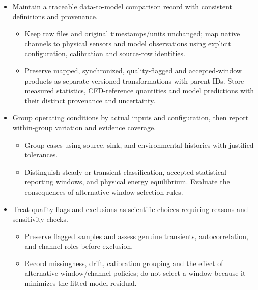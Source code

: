 \begin{itemize}[leftmargin=*]
\item Maintain a traceable data-to-model comparison record with consistent definitions and provenance.
\begin{itemize}
\item Keep raw files and original timestamps/\allowbreak{}units unchanged; map native channels to physical sensors and model observations using explicit configuration, calibration and source-row identities.
\item Preserve mapped, synchronized, quality-flagged and accepted-window products as separate versioned transformations with parent IDs. Store measured statistics, CFD-reference quantities and model predictions with their distinct provenance and uncertainty.
\end{itemize}
\item Group operating conditions by actual inputs and configuration, then report within-group variation and evidence coverage.
\begin{itemize}
\item Group cases using source, sink, and environmental histories with justified tolerances.
\item Distinguish steady or transient classification, accepted statistical reporting windows, and physical energy equilibrium. Evaluate the consequences of alternative window-selection rules.
\end{itemize}
\item Treat quality flags and exclusions as scientific choices requiring reasons and sensitivity checks.
\begin{itemize}
\item Preserve flagged samples and assess genuine transients, autocorrelation, and channel roles before exclusion.
\item Record missingness, drift, calibration grouping and the effect of alternative window/\allowbreak{}channel policies; do not select a window because it minimizes the fitted-model residual.
\end{itemize}
\end{itemize}
